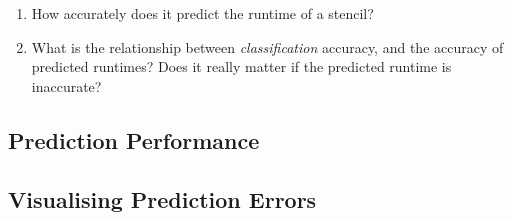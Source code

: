 

\begin{enumerate}
\item How accurately does it predict the runtime of a stencil?
\item What is the relationship between \emph{classification} accuracy,
  and the accuracy of predicted runtimes? Does it really matter if the
  predicted runtime is inaccurate?
\end{enumerate}


\subsection{Prediction Performance}

\subsection{Visualising Prediction Errors}

